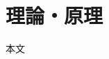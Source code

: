\documentclass[../../main.tex]{subfiles}
\numberwithin{equation}{section}
\numberwithin{table}{section}
\numberwithin{figure}{section}
\begin{document}
\section{理論・原理}
	本文
\end{document}
